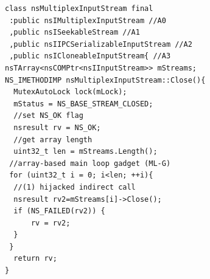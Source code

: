 % 

\newsavebox{\firstlisting}
\begin{lrbox}{\firstlisting}
\begin{minipage}[c]{\linewidth}
\begin{verbatim}
class nsMultiplexInputStream final 
 :public nsIMultiplexInputStream //A0
 ,public nsISeekableStream //A1
 ,public nsIIPCSerializableInputStream //A2
 ,public nsICloneableInputStream{ //A3
nsTArray<nsCOMPtr<nsIInputStream>> mStreams;
NS_IMETHODIMP nsMultiplexInputStream::Close(){
  MutexAutoLock lock(mLock);
  mStatus = NS_BASE_STREAM_CLOSED;
  //set NS_OK flag
  nsresult rv = NS_OK;
  //get array length
  uint32_t len = mStreams.Length();
 //array-based main loop gadget (ML-G)
 for (uint32_t i = 0; i<len; ++i){
  //(1) hijacked indirect call
  nsresult rv2=mStreams[i]->Close();
  if (NS_FAILED(rv2)) {
      rv = rv2;
  }
 }
  return rv;
}
\end{verbatim}
\end{minipage}
\end{lrbox}

